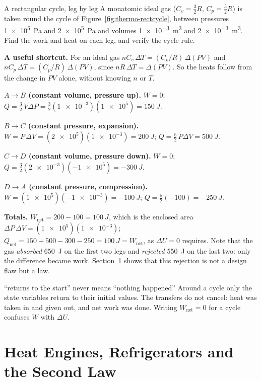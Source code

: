 \begin{exbox}{A rectangular cycle, leg by leg}\label{ex:thermo-rectcycle}
A monatomic ideal gas ($C_v=\tfrac32R$, $C_p=\tfrac52R$) is taken round the cycle of
Figure~\ref{fig:thermo-rectcycle}, between pressures \SI{1e5}{Pa} and \SI{2e5}{Pa} and volumes
\SI{1e-3}{m^3} and \SI{2e-3}{m^3}. Find the work and heat on each leg, and verify the cycle rule.

 \textbf{A useful shortcut.} For an ideal gas $nC_v\,\Delta T=(C_v/R)\,\Delta(PV)$ and
$nC_p\,\Delta T=(C_p/R)\,\Delta(PV)$, since $nR\,\Delta T=\Delta(PV)$. So the heats follow from the change in
$PV$ alone, without knowing $n$ or $T$.

 \textbf{$A\to B$ (constant volume, pressure up).} $W=0$;
$Q=\tfrac32\,V\Delta P=\tfrac32(\num{1e-3})(\num{1e5})=\SI{+150}{J}$.

 \textbf{$B\to C$ (constant pressure, expansion).} $W=P\,\Delta V=(\num{2e5})(\num{1e-3})=\SI{+200}{J}$;
$Q=\tfrac52\,P\Delta V=\SI{+500}{J}$.

 \textbf{$C\to D$ (constant volume, pressure down).} $W=0$;
$Q=\tfrac32(\num{2e-3})(\num{-1e5})=\SI{-300}{J}$.

 \textbf{$D\to A$ (constant pressure, compression).} $W=(\num{1e5})(\num{-1e-3})=\SI{-100}{J}$;
$Q=\tfrac52(\num{-100})=\SI{-250}{J}$.

 \textbf{Totals.} $W_{\text{net}}=200-100=\SI{100}{J}$, which is the enclosed area
$\Delta P\,\Delta V=(\num{1e5})(\num{1e-3})$; $Q_{\text{net}}=150+500-300-250=\SI{100}{J}=W_{\text{net}}$, as
$\Delta U=0$ requires. Note that the gas \emph{absorbed} \SI{650}{J} on the first two legs and
\emph{rejected} \SI{550}{J} on the last two: only the difference became work. Section~\ref{sec:secondlaw}
shows that this rejection is not a design flaw but a law.
\end{exbox}

\begin{trapbox}{``returns to the start'' never means ``nothing happened''}
Around a cycle only the state variables return to their initial values. The transfers do not cancel:
heat was taken in and given out, and net work was done. Writing $W_{\text{net}}=0$ for a cycle confuses
$W$ with $\Delta U$.
\end{trapbox}

\section{Heat Engines, Refrigerators and the Second Law}\label{sec:secondlaw}

